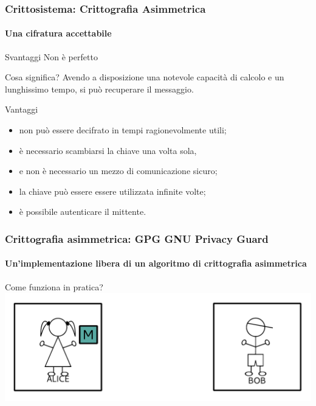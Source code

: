 \documentclass{beamer}
\begin{document}
\begin{frame}
\end{frame}

\begin{frame}
  \frametitle{Crittosistema: Crittografia Asimmetrica}
  \framesubtitle{Una cifratura accettabile}

  \begin{block}{Svantaggi}
    Non è perfetto
  \end{block}

  \begin{exampleblock}{Cosa significa?}
  Avendo a disposizione una notevole capacità di calcolo e un lunghissimo tempo,
  si può recuperare il messaggio.
  \end{exampleblock}

  \pause
  \begin{block}{Vantaggi}
    \begin{itemize}
      \item non può essere decifrato in tempi ragionevolmente utili;
      \item è necessario scambiarsi la chiave una volta sola,
      \item e non è necessario un mezzo di comunicazione sicuro;
      \item la chiave può essere essere utilizzata infinite volte;
      \item è possibile autenticare il mittente.
    \end{itemize}
  \end{block}

\end{frame}

\begin{frame}
  \frametitle{Crittografia asimmetrica: GPG GNU Privacy Guard}
  \framesubtitle{Un'implementazione libera di un algoritmo di crittografia asimmetrica}

  \begin{block}{Come funziona in pratica?}
    \centering
    \includegraphics[width=.9\linewidth]{img/ab0.pdf}
  \end{block}
\end{frame}
\end{document}
